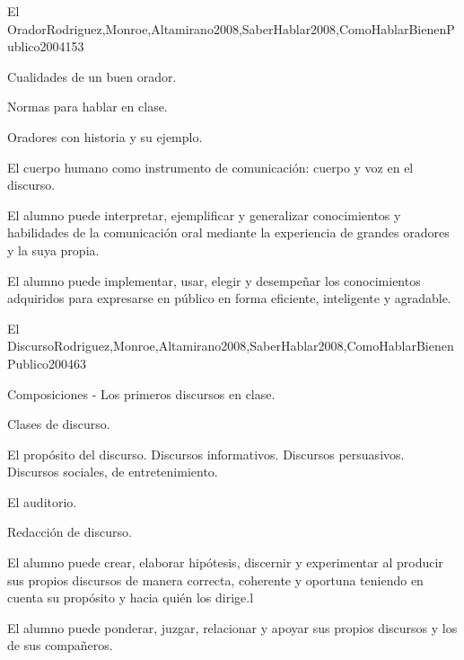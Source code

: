 \begin{syllabus}
\begin{unit}{El Orador}{Rodriguez,Monroe,Altamirano2008,SaberHablar2008,ComoHablarBienenPublico2004}{15}{3}
\begin{topics}
	\item Cualidades de un buen orador.
	\item Normas para hablar en clase.
	\item Oradores con historia y su ejemplo.
	\item El cuerpo humano como instrumento de comunicación: cuerpo y voz en el discurso.
\end{topics}
\begin{learningoutcomes}
	\item El alumno puede interpretar, ejemplificar y generalizar
conocimientos y habilidades de la comunicación oral mediante la experiencia de grandes oradores y la suya propia.
	\item El alumno puede implementar, usar, elegir y desempeñar los conocimientos adquiridos para  expresarse en público en forma eficiente, inteligente y agradable.
\end{learningoutcomes}
\end{unit}

\begin{unit}{El Discurso}{Rodriguez,Monroe,Altamirano2008,SaberHablar2008,ComoHablarBienenPublico2004}{6}{3}
\begin{topics}
	\item Composiciones - Los primeros discursos en clase.
	\item Clases de discurso.
	\item El propósito del discurso. Discursos informativos. Discursos persuasivos. Discursos sociales, de entretenimiento.
	\item El auditorio.	
	\item Redacción de discurso.
\end{topics}
\begin{learningoutcomes}
	\item El alumno puede crear, elaborar hipótesis, discernir y experimentar al producir sus propios discursos de manera correcta, coherente y oportuna teniendo en cuenta su propósito y hacia quién los dirige.l 
	\item El alumno puede ponderar, juzgar, relacionar y apoyar sus propios discursos y los de sus compañeros.
\end{learningoutcomes}
\end{unit}


\end{syllabus}
